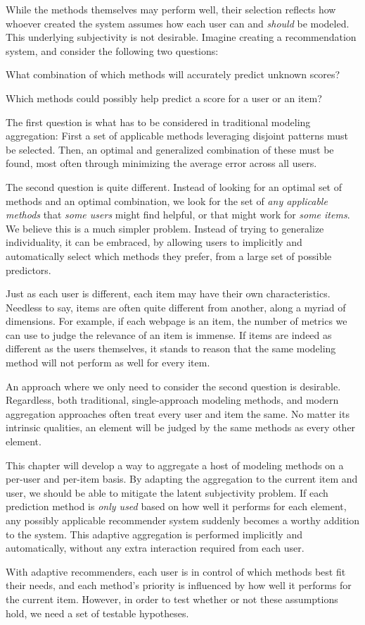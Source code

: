 While the methods themselves may perform well, their selection
reflects how whoever created the system assumes how each user
can and \emph{should} be modeled. This underlying subjectivity is not desirable.
Imagine creating a recommendation system, and consider the following two questions:

\begin{enumerate*}
  \item What combination of which methods will accurately predict unknown scores?
  \item Which methods could possibly help predict a score for a user or an item?
\end{enumerate*}

The first question is what has to be considered in traditional modeling aggregation:
First a set of applicable methods leveraging disjoint patterns must be selected. 
Then, an optimal and generalized combination of these must be found,
most often through minimizing the average error across all users.

The second question is quite different. 
Instead of looking for an optimal set of methods and an optimal combination,
we look for the set of \emph{any applicable methods} that \emph{some users} might find helpful,
or that might work for \emph{some items}.
We believe this is a much simpler problem. 
Instead of trying to generalize individuality,
it can be embraced, by allowing users to implicitly and automatically select which methods they prefer,
from a large set of possible predictors.

Just as each user is different, each item may have their own characteristics.
Needless to say, items are often quite different from another,
along a myriad of dimensions. For example,
if each webpage is an item, the number of metrics we can use to judge
the relevance of an item is immense.
If items are indeed as different as the users themselves, it stands to reason that the same 
modeling method will not perform as well for every item.

An approach where we only need to consider the second question is desirable.
Regardless, both traditional, single-approach modeling methods, and modern aggregation approaches
often treat every user and item the same. No matter its intrinsic qualities, an element will be judged
by the same methods as every other element. 

This chapter will develop a way to aggregate a host of modeling methods on a per-user and per-item basis.
By adapting the aggregation to the current item and user, we should be able to mitigate the latent subjectivity problem. 
If each prediction method is \emph{only used} based on how well it performs for each element,
any possibly applicable recommender system suddenly becomes a worthy addition to the system.
This adaptive aggregation is performed implicitly and automatically,
without any extra interaction required from each user.

With adaptive recommenders, each user is in control of which methods best fit their needs, and
each method's priority is influenced by how well it performs for the current item.
However, in order to test whether or not these assumptions hold,
we need a set of testable hypotheses.

\clearpage
